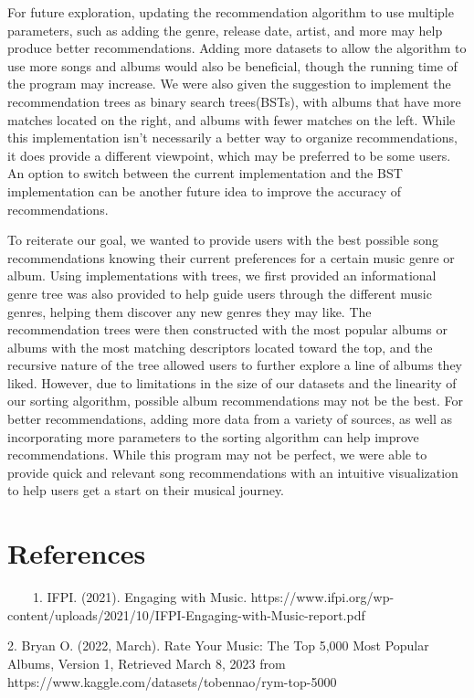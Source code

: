 \documentclass[fontsize=11pt]{article}
\begin{document}
For future exploration, updating the recommendation algorithm to use multiple parameters, such as adding the genre, release date, artist, and more may help produce better recommendations. Adding more datasets to allow the algorithm to use more songs and albums would also be beneficial, though the running time of the program may increase. We were also given the suggestion to implement the recommendation trees as binary search trees(BSTs), with albums that have more matches located on the right, and albums with fewer matches on the left. While this implementation isn't necessarily a better way to organize recommendations, it does provide a different viewpoint, which may be preferred to be some users. An option to switch between the current implementation and the BST implementation can be another future idea to improve the accuracy of recommendations. \newline

To reiterate our goal, we wanted to provide users with the best possible song recommendations knowing their current preferences for a certain music genre or album. Using implementations with trees, we first provided an informational genre tree was also provided to help guide users through the different music genres, helping them discover any new genres they may like. The recommendation trees were then constructed with the most popular albums or albums with the most matching descriptors located toward the top, and the recursive nature of the tree allowed users to further explore a line of albums they liked. However, due to limitations in the size of our datasets and the linearity of our sorting algorithm, possible album recommendations may not be the best. For better recommendations, adding more data from a variety of sources, as well as incorporating more parameters to the sorting algorithm can help improve recommendations. While this program may not be perfect, we were able to provide quick and relevant song recommendations with an intuitive visualization to help users get a start on their musical journey.

\section*{References}
~~~~1. IFPI. (2021). Engaging with Music. https://www.ifpi.org/wp-content/uploads/2021/10/IFPI-Engaging-with-Music-report.pdf \newline

2. Bryan O. (2022, March). Rate Your Music: The Top 5,000 Most Popular Albums, Version 1, Retrieved March 8, 2023 from https://www.kaggle.com/datasets/tobennao/rym-top-5000 \newline
\end{document}
